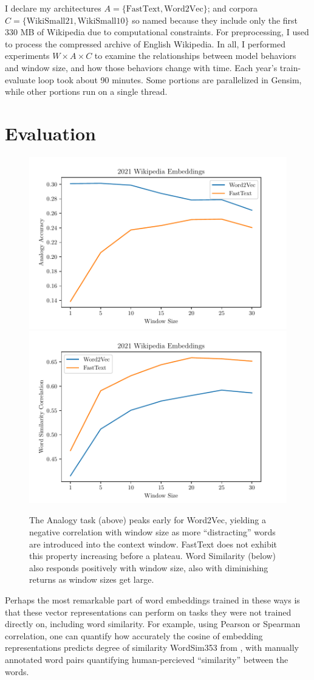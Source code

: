 \documentclass[11pt,a4paper]{article}
\begin{document}
I declare my architectures $A = \{\text{FastText},
  \text{Word2Vec} \}$; and corpora $C = \{\text{WikiSmall21} , \text{WikiSmall10}
  \}$ so named because they include only the first 330 MB of Wikipedia due to
computational constraints. For preprocessing, I used \citet{Wikiextractor2014}
to process the compressed archive of English Wikipedia. In all, I performed
experiments $W \times A \times C$ to examine the relationships between model
behaviors and window size, and how those behaviors change with time. Each year's
train-evaluate loop took about 90 minutes. Some portions are parallelized in
Gensim, while other portions run on a single thread.

\section{Evaluation}
\begin{figure}
  \includegraphics[width=.5\textwidth]{figures/analogy-avg_x_window_size_2021.pdf}
  \includegraphics[width=.5\textwidth]{figures/wordsim_x_window-size_2021.pdf}
  \caption{The Analogy task (above) peaks early for Word2Vec, yielding a
    negative correlation with window size as more ``distracting'' words are
    introduced into the context window. FastText does not exhibit this property
    increasing before a plateau. Word Similarity (below) also responds positively
    with window size, also with diminishing returns as window sizes get large. \label{perf21}}
\end{figure}

Perhaps the most remarkable part of word embeddings trained in these ways is
that these vector representations can perform on tasks they were not trained
directly on, including word similarity. For example, using Pearson or Spearman
correlation, one can quantify how accurately the cosine of embedding
representations predicts degree of similarity WordSim353 from
\citep{agirre2009study}, with manually annotated word pairs quantifying
human-percieved ``similarity'' between the words.
\end{document}
